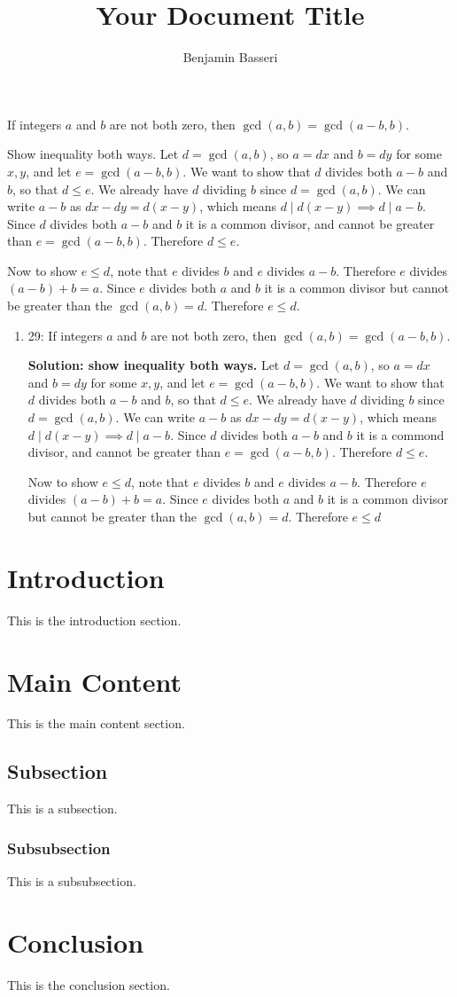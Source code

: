 \documentclass{article}
\title{Your Document Title}
\author{Benjamin Basseri}
\begin{document}
\maketitle

\begin{problem}
If integers $a$ and $b$ are not both zero, then $\gcd(a,b)=\gcd(a-b,b)$.
\end{problem}

\begin{solution}
  Show inequality both ways. Let $d = \gcd(a, b)$, so $a = dx$ and $b = dy$ for some $x, y$, and let $e = \gcd(a - b, b)$. We want to show that $d$ divides both $a - b$ and $b$, so that $d \leq e$. We already have $d$ dividing $b$ since $d = \gcd(a, b)$. We can write $a - b$ as $dx - dy = d(x-y)$, which means $d\mid d(x-y) \implies d\mid a-b$. Since $d$ divides both $a-b$ and $b$ it is a common divisor, and cannot be greater than $e = \gcd(a-b, b)$. Therefore $d \leq e$.

  Now to show $e \leq d$, note that $e$ divides $b$ and $e$ divides $a - b$. Therefore $e$ divides $(a - b) + b = a$. Since $e$ divides both $a$ and $b$ it is a common divisor but cannot be greater than the $\gcd(a, b) = d$. Therefore $e \leq d$.
\end{solution}

\begin{enumerate}
  \item 29: If integers $a$ and $b$ are not both zero, then $\gcd(a,b)=\gcd(a-b,b)$.

        \textbf{Solution: show inequality both ways.} Let $d = \gcd(a, b)$, so $a = dx$ and $b = dy$ for some $x, y$, and let $e = \gcd(a - b, b)$. We want to show that $d$ divides both $a - b$ and $b$, so that $d \leq e$. We already have $d$ dividing $b$ since $d = \gcd(a, b)$. We can write $a - b$ as $dx - dy = d(x-y)$, which means $d\mid d(x-y) \implies d\mid a-b$. Since $d$ divides both $a-b$ and $b$ it is a commond divisor, and cannot be greater than $e = \gcd(a-b, b)$. Therefore $d \leq e$.

        Now to show $e \leq d$, note that $e$ divides $b$ and $e$ divides $a - b$. Therefore $e$ divides $(a - b) + b = a$. Since $e$ divides both $a$ and $b$ it is a common divisor but cannot be greater than the $\gcd(a, b) = d$. Therefore $e \leq d$
\end{enumerate}
\section{Introduction}
This is the introduction section.

\section{Main Content}
This is the main content section.

\subsection{Subsection}
This is a subsection.

\subsubsection{Subsubsection}
This is a subsubsection.

\section{Conclusion}
This is the conclusion section.
\end{document}
